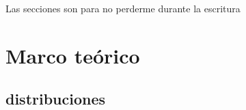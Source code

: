\documentclass[12pt,letterpaper]{article}
\begin{document}
\maketitle
%
\tableofcontents
\pagebreak
Las secciones son para no perderme durante la escritura
\section {Marco teórico}\label{sec:marco}



\subsection {distribuciones}\label{subsec:dd}

\end{document}
